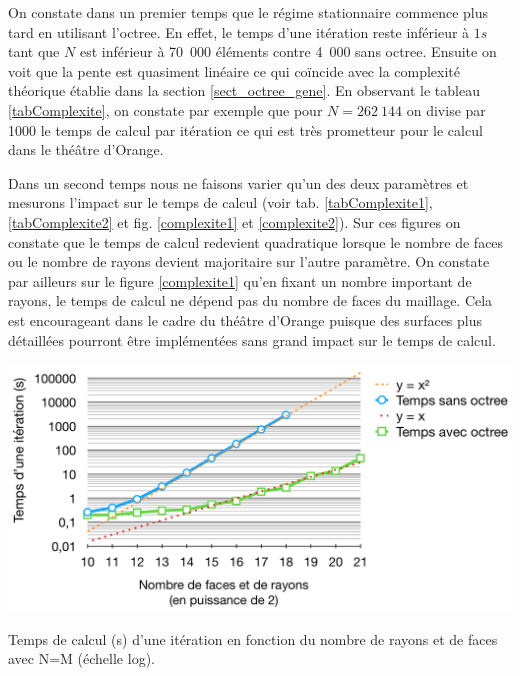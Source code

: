 On constate dans un premier temps que le régime stationnaire commence plus tard en utilisant l'\gls{octree}. En effet, le temps d'une itération reste inférieur à $1s$ tant que $N$ est inférieur à 70~000 éléments contre 4~000 sans \gls{octree}. Ensuite on voit que la pente est quasiment linéaire ce qui coïncide avec la complexité théorique établie dans la section \ref{sect_octree_gene}.%
En observant le tableau \ref{tabComplexite}, on constate par exemple que pour $N = 262~144$ on divise par 1000 le temps de calcul par itération ce qui est très prometteur pour le calcul dans le théâtre d'Orange.

Dans un second temps nous ne faisons varier qu'un des deux paramètres et mesurons l'impact sur le temps de calcul (voir tab. \ref{tabComplexite1},  \ref{tabComplexite2} et fig. \ref{complexite1} et \ref{complexite2}). Sur ces figures on constate que le temps de calcul redevient quadratique lorsque le nombre de faces ou le nombre de rayons devient majoritaire sur l'autre paramètre. On constate par ailleurs sur le figure \ref{complexite1} qu'en fixant un nombre important de rayons, le temps de calcul ne dépend pas du nombre de faces du maillage. Cela est encourageant dans le cadre du théâtre d'Orange puisque des surfaces plus détaillées pourront être implémentées sans grand impact sur le temps de calcul.

 \begin{figureth}
	\includegraphics[width=\linewidth]{images/complexite}
	\caption{Temps de calcul (s) d'une itération en fonction du nombre de rayons et de faces avec N=M (échelle log).}
	\label{complexite}
\end{figureth}

